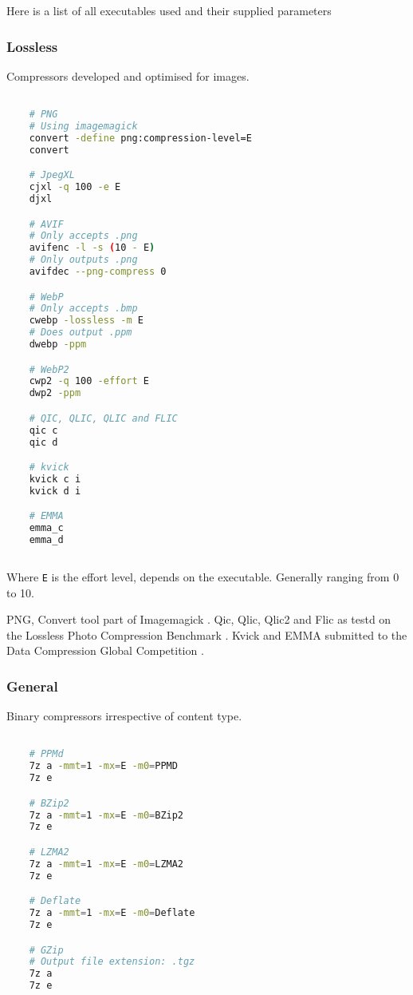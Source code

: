\documentclass[11pt,a4paper]{report}
\begin{document}
Here is a list of all executables used and their supplied parameters

\lstset{style=cmdstyle}

\subsubsection{Lossless}

Compressors developed and optimised for images.

\begin{lstlisting}[language = bash]

    # PNG
    # Using imagemagick
    convert -define png:compression-level=E
    convert

    # JpegXL
    cjxl -q 100 -e E
    djxl

    # AVIF
    # Only accepts .png
    avifenc -l -s (10 - E)
    # Only outputs .png
    avifdec --png-compress 0

    # WebP
    # Only accepts .bmp
    cwebp -lossless -m E
    # Does output .ppm
    dwebp -ppm

    # WebP2
    cwp2 -q 100 -effort E
    dwp2 -ppm

    # QIC, QLIC, QLIC and FLIC
    qic c
    qic d

    # kvick
    kvick c i
    kvick d i

    # EMMA
    emma_c
    emma_d
    
\end{lstlisting}

Where \verb|E| is the effort level, depends on the executable. Generally ranging from 0 to 10.

PNG, Convert tool part of Imagemagick \cite{imagemagick}. Qic, Qlic, Qlic2 and Flic as testd on the Lossless Photo Compression Benchmark \cite{lpcb}. Kvick and EMMA submitted to the Data Compression Global Competition \cite{dcgc}.

\subsubsection{General}

Binary compressors irrespective of content type.

\begin{lstlisting}[language = bash]

    # PPMd
    7z a -mmt=1 -mx=E -m0=PPMD
    7z e

    # BZip2
    7z a -mmt=1 -mx=E -m0=BZip2
    7z e

    # LZMA2
    7z a -mmt=1 -mx=E -m0=LZMA2
    7z e

    # Deflate
    7z a -mmt=1 -mx=E -m0=Deflate
    7z e

    # GZip
    # Output file extension: .tgz
    7z a
    7z e

\end{lstlisting}
\end{document}

